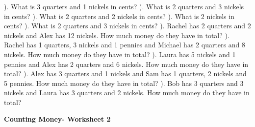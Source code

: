 \documentclass{article}%
\begin{document}
\newline%
). What is 3 quarters and 1 nickels in cents?%
\newline%
\newline%
). What is 2 quarters and 3 nickels in cents?%
\newline%
\newline%
). What is 2 quarters and 2 nickels in cents?%
\newline%
\newline%
). What is 2 nickels in cents?%
\newline%
\newline%
). What is 2 quarters and 3 nickels in cents?%
\newline%
\newline%
). Rachel has 2 quarters and 2 nickels and Alex has 12 nickels. How much money do they have in total?%
\newline%
\newline%
). Rachel has 1 quarters, 3 nickels and 1 pennies and Michael has 2 quarters and 8 nickels. How much money do they have in total?%
\newline%
\newline%
). Laura has 5 nickels and 1 pennies and Alex has 2 quarters and 6 nickels. How much money do they have in total?%
\newline%
\newline%
). Alex has 3 quarters and 1 nickels and Sam has 1 quarters, 2 nickels and 5 pennies. How much money do they have in total?%
\newline%
\newline%
). Bob has 3 quarters and 3 nickels and Laura has 3 quarters and 2 nickels. How much money do they have in total?%
\newline%
\newline%
\newline%
\pagebreak%
\large%
\begin{center}%
\textbf{Counting Money- Worksheet 2}%
\newline%
\end{center} \normalsize%
\end{document}
